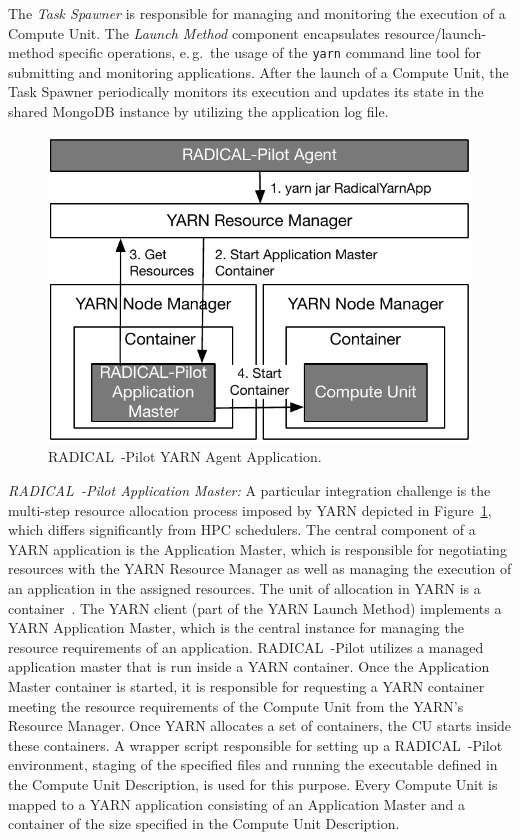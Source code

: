 The \emph{Task Spawner} is responsible for managing and monitoring the execution of a Compute Unit.
The \emph{Launch Method} component encapsulates resource/launch-method specific operations, e.\,g.\ the usage of the \texttt{yarn} command line tool for submitting and monitoring applications.
After the launch of a Compute Unit, the Task Spawner periodically monitors its execution and updates its state in the shared MongoDB instance by utilizing the application log file.

\begin{figure}[t]
    \centering
    \includegraphics[width=.65\textwidth]{figures/data_analytics_hpc/hpc_hadoop/yarn.pdf}
    \caption{RADICAL~-Pilot YARN Agent Application.}
    \label{fig:figures_yarn}
\end{figure}

\emph{RADICAL~-Pilot Application Master:}
A particular integration challenge is the multi-step resource allocation process imposed by YARN depicted in Figure~\ref{fig:figures_yarn}, which differs significantly from HPC schedulers.
The central component of a YARN application is the Application Master, which is responsible for negotiating resources with the YARN Resource Manager as well as managing the execution of an application in the assigned resources.
The unit of allocation in YARN is a container~\cite{murthy2014apache}.
The YARN client (part of the YARN Launch Method) implements a YARN Application Master, which is the central instance for managing the resource requirements of an application.
RADICAL~-Pilot utilizes a managed application master that is run inside a YARN container.
Once the Application Master container is started, it is responsible for requesting a YARN container meeting the resource requirements of the Compute Unit from the YARN's Resource Manager.
Once YARN allocates a set of containers, the CU starts inside these containers.
A wrapper script responsible for setting up a RADICAL~-Pilot environment, staging of the specified files and running the executable defined in the Compute Unit Description, is used for this purpose.
Every Compute Unit is mapped to a YARN application consisting of an Application Master and a container of the size specified in the Compute Unit Description.

